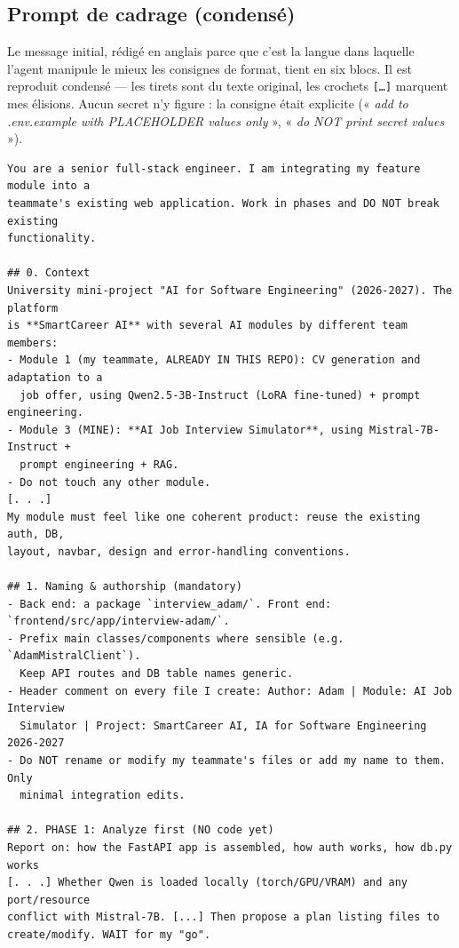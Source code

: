 \subsection{Prompt de cadrage (condensé)}

Le message initial, rédigé en anglais parce que c'est la langue dans laquelle
l'agent manipule le mieux les consignes de format, tient en six blocs. Il est
reproduit condensé --- les tirets sont du texte original, les crochets
\texttt{[\dots]} marquent mes élisions. Aucun secret n'y figure : la consigne
était explicite (« \emph{add to .env.example with PLACEHOLDER values only} »,
« \emph{do NOT print secret values} »).

\begin{lstlisting}[style=adamprompt]
You are a senior full-stack engineer. I am integrating my feature module into a
teammate's existing web application. Work in phases and DO NOT break existing
functionality.

## 0. Context
University mini-project "AI for Software Engineering" (2026-2027). The platform
is **SmartCareer AI** with several AI modules by different team members:
- Module 1 (my teammate, ALREADY IN THIS REPO): CV generation and adaptation to a
  job offer, using Qwen2.5-3B-Instruct (LoRA fine-tuned) + prompt engineering.
- Module 3 (MINE): **AI Job Interview Simulator**, using Mistral-7B-Instruct +
  prompt engineering + RAG.
- Do not touch any other module.
[. . .]
My module must feel like one coherent product: reuse the existing auth, DB,
layout, navbar, design and error-handling conventions.

## 1. Naming & authorship (mandatory)
- Back end: a package `interview_adam/`. Front end: `frontend/src/app/interview-adam/`.
- Prefix main classes/components where sensible (e.g. `AdamMistralClient`).
  Keep API routes and DB table names generic.
- Header comment on every file I create: Author: Adam | Module: AI Job Interview
  Simulator | Project: SmartCareer AI, IA for Software Engineering 2026-2027
- Do NOT rename or modify my teammate's files or add my name to them. Only
  minimal integration edits.

## 2. PHASE 1: Analyze first (NO code yet)
Report on: how the FastAPI app is assembled, how auth works, how db.py works
[. . .] Whether Qwen is loaded locally (torch/GPU/VRAM) and any port/resource
conflict with Mistral-7B. [...] Then propose a plan listing files to
create/modify. WAIT for my "go".


\end{lstlisting}
